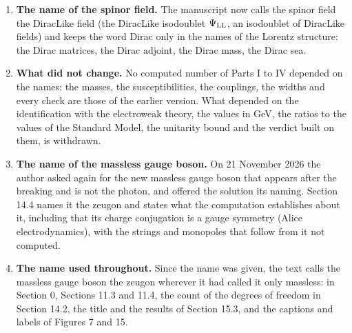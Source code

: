 \documentclass[
  10pt,
]{article}
\begin{document}
\begin{enumerate}
  Lee, Quigg and Thacker derived for the scattering of the longitudinal
  \(W\) and \(Z\) bosons and the Higgs boson of the doublet of the
  Standard Model; it set \(v^X_{\rm SF}=246.22\) GeV and gave the masses
  and the critical temperature in GeV (Table 14.2, its rows 17 to 19 and
  its column of the Standard Model); and it concluded that the amplitude
  mode is too heavy, strongly coupled, broad and accompanied by charged
  scalars, and so is not the observed boson. These comparisons had no
  basis. The DiracLike spinor carries no electroweak quantum numbers, so
  the superfluid is a singlet of the electroweak group and cannot be its
  Higgs field whatever its numbers are, and nothing fixes the scale of
  the new group in GeV. The comparisons are withdrawn; Section 14.6 now
  answers separately whether the superfluid is the Higgs field of its
  own gauge group (yes, in every method, with an amplitude mode that is
  a resonance broader than its mass) and whether it can be the Higgs
  field of the Standard Model (no, by its quantum numbers, in every
  method). Table 14.2 no longer contains the values in GeV and the
  values of the Standard Model, and the programs no longer compute them:
  the Rust module \texttt{higgs} and its Python counterpart write no row
  of the Standard Model and no values in GeV into
  \texttt{data/part3\_higgs.csv}, and the checks P3-H4, YP3-H4 and
  WP3-H4 of that row were removed.
\item
  \textbf{The name of the spinor field.} The manuscript now calls the
  spinor field the DiracLike field (the DiracLike isodoublet
  \(\Psi_{\rm LL}\), an isodoublet of DiracLike fields) and keeps the
  word Dirac only in the names of the Lorentz structure: the Dirac
  matrices, the Dirac adjoint, the Dirac mass, the Dirac sea.
\item
  \textbf{What did not change.} No computed number of Parts I to IV
  depended on the names: the masses, the susceptibilities, the
  couplings, the widths and every check are those of the earlier
  version. What depended on the identification with the electroweak
  theory, the values in GeV, the ratios to the values of the Standard
  Model, the unitarity bound and the verdict built on them, is
  withdrawn.
\item
  \textbf{The name of the massless gauge boson.} On 21 November 2026 the
  author asked again for the new massless gauge boson that appears after
  the breaking and is not the photon, and offered the solution its
  naming. Section 14.4 names it the zeugon and states what the
  computation establishes about it, including that its charge
  conjugation is a gauge symmetry (Alice electrodynamics), with the
  strings and monopoles that follow from it not computed.
\item
  \textbf{The name used throughout.} Since the name was given, the text
  calls the massless gauge boson the zeugon wherever it had called it
  only massless: in Section 0, Sections 11.3 and 11.4, the count of the
  degrees of freedom in Section 14.2, the title and the results of
  Section 15.3, and the captions and labels of Figures 7 and 15.
\end{enumerate}
\end{document}
